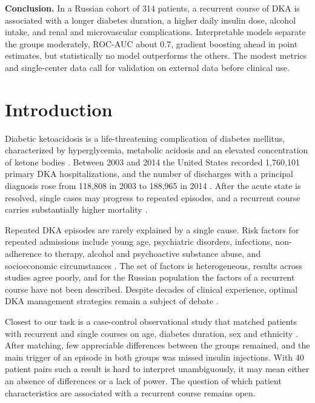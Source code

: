 \documentclass[pdflatex,sn-basic,Numbered]{sn-jnl}
\begin{document}
{\textbf{Conclusion.} In a Russian cohort of 314 patients, a recurrent course of DKA is associated with a longer diabetes duration, a higher daily insulin dose, alcohol intake, and renal and microvascular complications. Interpretable models separate the groups moderately, ROC-AUC about 0.7, gradient boosting ahead in point estimates, but statistically no model outperforms the others. The modest metrics and single-center data call for validation on external data before clinical use.}


\maketitle

\section{Introduction}\label{sec1}

Diabetic ketoacidosis is a life-threatening complication of diabetes mellitus, characterized by hyperglycemia, metabolic acidosis and an elevated concentration of ketone bodies \cite{ref1}. Between 2003 and 2014 the United States recorded 1,760,101 primary DKA hospitalizations, and the number of discharges with a principal diagnosis rose from 118,808 in 2003 to 188,965 in 2014 \cite{ref2}. After the acute state is resolved, single cases may progress to repeated episodes, and a recurrent course carries substantially higher mortality \cite{ref3,ref4}.

Repeated DKA episodes are rarely explained by a single cause. Risk factors for repeated admissions include young age, psychiatric disorders, infections, non-adherence to therapy, alcohol and psychoactive substance abuse, and socioeconomic circumstances \cite{ref5,ref6,ref7}. The set of factors is heterogeneous, results across studies agree poorly, and for the Russian population the factors of a recurrent course have not been described. Despite decades of clinical experience, optimal DKA management strategies remain a subject of debate \cite{ref8}.

Closest to our task is a case-control observational study that matched patients with recurrent and single courses on age, diabetes duration, sex and ethnicity \cite{ref9}. After matching, few appreciable differences between the groups remained, and the main trigger of an episode in both groups was missed insulin injections. With 40 patient pairs such a result is hard to interpret unambiguously, it may mean either an absence of differences or a lack of power. The question of which patient characteristics are associated with a recurrent course remains open.
\end{document}
